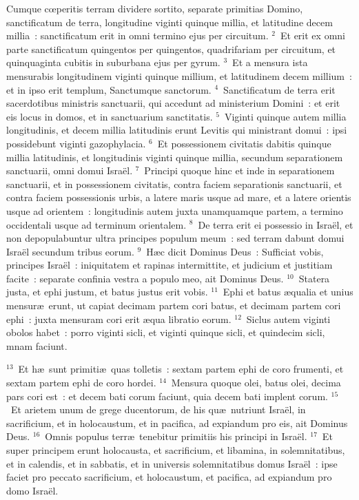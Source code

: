 \lettrine[lines=10,image=true,loversize=0.05,lraise=-0.03]{C}{}umque cœperitis terram dividere sortito, separate primitias Domino, sanctificatum de terra, longitudine viginti quinque millia, et latitudine decem millia~: sanctificatum erit in omni termino ejus per circuitum.
${}^{2}$~Et erit ex omni parte sanctificatum quingentos per quingentos, quadrifariam per circuitum, et quinquaginta cubitis in suburbana ejus per gyrum.
${}^{3}$~Et a mensura ista mensurabis longitudinem viginti quinque millium, et latitudinem decem millium~: et in ipso erit templum, Sanctumque sanctorum.
${}^{4}$~Sanctificatum de terra erit sacerdotibus ministris sanctuarii, qui accedunt ad ministerium Domini~: et erit eis locus in domos, et in sanctuarium sanctitatis.
${}^{5}$~Viginti quinque autem millia longitudinis, et decem millia latitudinis erunt Levitis qui ministrant domui~: ipsi possidebunt viginti gazophylacia.
${}^{6}$~Et possessionem civitatis dabitis quinque millia latitudinis, et longitudinis viginti quinque millia, secundum separationem sanctuarii, omni domui Isra\"el.
${}^{7}$~Principi quoque hinc et inde in separationem sanctuarii, et in possessionem civitatis, contra faciem separationis sanctuarii, et contra faciem possessionis urbis, a latere maris usque ad mare, et a latere orientis usque ad orientem~: longitudinis autem juxta unamquamque partem, a termino occidentali usque ad terminum orientalem.
${}^{8}$~De terra erit ei possessio in Isra\"el, et non depopulabuntur ultra principes populum meum~: sed terram dabunt domui Isra\"el secundum tribus eorum.
${}^{9}$~H\ae c dicit Dominus Deus~: Sufficiat vobis, principes Isra\"el~: iniquitatem et rapinas intermittite, et judicium et justitiam facite~: separate confinia vestra a populo meo, ait Dominus Deus.
${}^{10}$~Statera justa, et ephi justum, et batus justus erit vobis.
${}^{11}$~Ephi et batus \ae qualia et unius mensur\ae\ erunt, ut capiat decimam partem cori batus, et decimam partem cori ephi~: juxta mensuram cori erit \ae qua libratio eorum.
${}^{12}$~Siclus autem viginti obolos habet~: porro viginti sicli, et viginti quinque sicli, et quindecim sicli, mnam faciunt.


${}^{13}$~Et h\ae\ sunt primiti\ae\ quas tolletis~: sextam partem ephi de coro frumenti, et sextam partem ephi de coro hordei.
${}^{14}$~Mensura quoque olei, batus olei, decima pars cori est~: et decem bati corum faciunt, quia decem bati implent corum.
${}^{15}$~Et arietem unum de grege ducentorum, de his qu\ae\ nutriunt Isra\"el, in sacrificium, et in holocaustum, et in pacifica, ad expiandum pro eis, ait Dominus Deus.
${}^{16}$~Omnis populus terr\ae\ tenebitur primitiis his principi in Isra\"el.
${}^{17}$~Et super principem erunt holocausta, et sacrificium, et libamina, in solemnitatibus, et in calendis, et in sabbatis, et in universis solemnitatibus domus Isra\"el~: ipse faciet pro peccato sacrificium, et holocaustum, et pacifica, ad expiandum pro domo Isra\"el.


